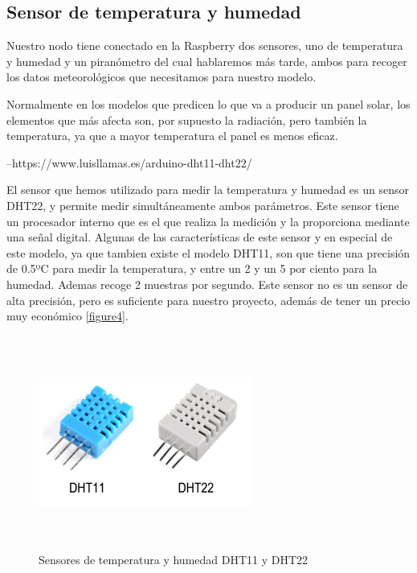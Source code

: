 \subsection{Sensor de temperatura y humedad}

Nuestro nodo tiene conectado en la Raspberry dos sensores, uno de temperatura y humedad y un piranómetro del cual hablaremos más tarde, ambos para recoger los datos meteorológicos que necesitamos para nuestro modelo.

Normalmente en los modelos que predicen lo que va a producir un panel solar, los elementos que más afecta son, por supuesto la radiación, pero también la temperatura, ya que a mayor temperatura el panel es menos eficaz. 

--https://www.luisllamas.es/arduino-dht11-dht22/

El sensor que hemos utilizado para medir la temperatura y humedad es un sensor DHT22, y permite medir simultáneamente ambos parámetros. 
Este sensor tiene un procesador interno que es el que realiza la medición y la proporciona mediante una señal digital.
Algunas de las características de este sensor y en especial de este modelo, ya que tambien existe el modelo DHT11, son que tiene una precisión de 0.5ºC para medir la temperatura, y entre un 2 y un 5 por ciento para la humedad. Ademas recoge 2 muestras por segundo. Este sensor no es un sensor de alta precisión, pero es suficiente para nuestro proyecto, además de tener un precio muy económico \ref{figure4}.

 \begin{figure}[htb]
	
	\begin{center}
		\includegraphics[width=7cm,height=7cm]{figures/sensorTemperaturaHumedad.png}
		\caption{Sensores de temperatura y humedad DHT11 y DHT22}
	\end{center}
	
	\label{figure5}
\end{figure} 

